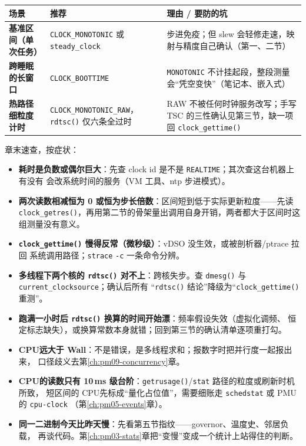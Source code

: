 \documentclass[12pt,a4paper,fontset=fandol]{ctexbook}
\newcommand{\Fn}[1]{\texttt{#1()}}
\newcommand{\Tp}[1]{\texttt{#1}}
\newcommand{\Bk}{\discretionary{}{}{}}
\newcommand{\Lang}[1]{\textsf{#1}}
\newcommand{\MWall}{\Lang{Wall}}
\newcommand{\MCpu}{\Lang{CPU}}
\begin{document}
\begin{compare}[title={三种典型场景的时钟选型}, label={box:pm02-choice}]
\begin{tabular}{@{}>{\raggedright\arraybackslash}p{} >{\raggedright\arraybackslash}p{} >{\raggedright\arraybackslash}p{}@{}}
\toprule
\textbf{场景} & \textbf{推荐} & \textbf{理由 / 要防的坑}\\
\midrule
\textbf{基准区间（单次任务）} & \Tp{CLOCK{\Bk}\_MONOTONIC} 或 \Tp{steady{\Bk}\_clock} &
步进免疫；但 slew 会轻修走速，映射与精度自己确认（第一、二节）\\
\textbf{跨睡眠的长窗口} & \Tp{CLOCK{\Bk}\_BOOTTIME} &
\Tp{MONOTONIC} 不计挂起段，整段测量会``凭空变快''（笔记本、嵌入式）\\
\textbf{热路径细粒度计时} & \Tp{CLOCK{\Bk}\_MONOTONIC{\Bk}\_RAW}，\Fn{rdtsc} 仅六条全过时 &
RAW 不被任何时钟服务改写；手写 TSC 的三性确认见第三节，缺一项回 \Fn{clock{\Bk}\_gettime}\\
\bottomrule
\end{tabular}
\end{compare}

章末速查，按症状：

\begin{itemize}
\item \textbf{耗时是负数或偶尔巨大}：先查 clock id 是不是 \Tp{REALTIME}；其次查这台机器上有没有
会改系统时间的服务（VM 工具、ntp 步进模式）。
\item \textbf{两次读数相减恒为 0 或恒为步长倍数}：区间短到低于实际更新粒度——先读
\Fn{clock{\Bk}\_getres}，再用第二节的骨架量出调用自身开销，两者都大于区间时这组测量没有意义。
\item \textbf{\Fn{clock{\Bk}\_gettime} 慢得反常（微秒级）}：vDSO 没生效，或被剖析器/ptrace 拉回
系统调用路径；\Tp{strace} \Tp{-c} 一条命令分辨。
\item \textbf{多线程下两个核的 \Fn{rdtsc} 对不上}：跨核失步。查 \Fn{dmesg} 与
\Tp{current{\Bk}\_clocksource}；确认后所有 ``\Fn{rdtsc} 结论''降级为``\Fn{clock{\Bk}\_gettime} 重测''。
\item \textbf{跑满一小时后 \Fn{rdtsc} 换算的时间开始漂}：频率假设失效（虚拟化调频、
恒定标志缺失），或换算常数本身就错；回到第三节的确认清单逐项重打勾。
\item \textbf{\MCpu 远大于 \MWall}：不是错误，是多线程求和；报数字时把并行度一起报出来，
口径歧义去第\ref{ch:pm09-concurrency}章。
\item \textbf{\MCpu 的读数只有 10\,ms 级台阶}：\Fn{getrusage}/\Tp{stat} 路径的粒度或刷新时机所致，
短区间的 \MCpu 先标成``量化占位值''，需要细账走 \Tp{schedstat} 或 PMU 的 \Tp{cpu-clock}
（第\ref{ch:pm05-events}章）。
\item \textbf{同一二进制今天比昨天慢}：先看第五节指纹——governor、温度史、邻居负载，
再谈代码。第\ref{ch:pm03-stats}章把``变慢''变成一个统计上站得住的判断。
\end{itemize}
\end{document}
